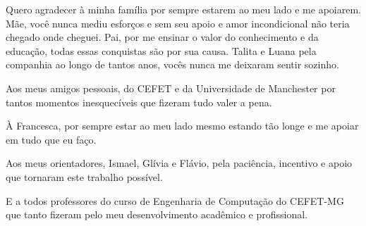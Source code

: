 
\begin{agradecimentos}

Quero agradecer à minha família por sempre estarem ao meu lado e me apoiarem. Mãe, você
nunca mediu esforços e sem seu apoio e amor incondicional não teria chegado onde cheguei. 
Pai, por me ensinar o valor do conhecimento e da educação, todas essas conquistas são por sua 
causa. Talita e Luana pela companhia ao longo de tantos anos, vocês nunca me deixaram sentir 
sozinho.

Aos meus amigos pessoais, do CEFET e da Universidade de Manchester por tantos momentos 
inesquecíveis que fizeram tudo valer a pena.

À Francesca, por sempre estar ao meu lado mesmo estando tão longe e me apoiar em 
tudo que eu faço.

Aos meus orientadores, Ismael, Glívia e Flávio, pela paciência, incentivo e apoio que tornaram 
este trabalho possível.

E a todos professores do curso de Engenharia de Computação do CEFET-MG que tanto fizeram
pelo meu desenvolvimento acadêmico e profissional.

\end{agradecimentos}
